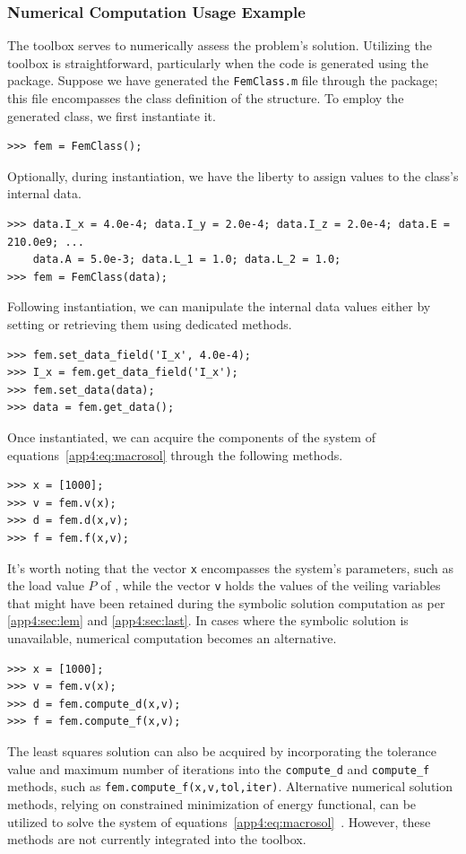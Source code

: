 \subsubsection{Numerical Computation Usage Example}

The \TrussMe{} \Matlab{} toolbox serves to numerically assess the problem's solution. Utilizing the toolbox is straightforward, particularly when the code is generated using the \TrussMe{} \Maple{} package. Suppose we have generated the \texttt{FemClass.m} file through the \TrussMe{} \Maple{} package; this file encompasses the class definition of the structure. To employ the generated class, we first instantiate it.
%
\begin{verbatim}
>>> fem = FemClass();
\end{verbatim}
%
Optionally, during instantiation, we have the liberty to assign values to the class's internal data.
%
\begin{verbatim}
>>> data.I_x = 4.0e-4; data.I_y = 2.0e-4; data.I_z = 2.0e-4; data.E = 210.0e9; ...
    data.A = 5.0e-3; data.L_1 = 1.0; data.L_2 = 1.0;
>>> fem = FemClass(data);
\end{verbatim}
%
Following instantiation, we can manipulate the internal data values either by setting or retrieving them using dedicated methods.
%
\begin{verbatim}
>>> fem.set_data_field('I_x', 4.0e-4);
>>> I_x = fem.get_data_field('I_x');
>>> fem.set_data(data);
>>> data = fem.get_data();
\end{verbatim}
%
Once instantiated, we can acquire the components of the system of equations~\eqref{app4:eq:macrosol} through the following methods.
%
\begin{verbatim}
>>> x = [1000];
>>> v = fem.v(x);
>>> d = fem.d(x,v);
>>> f = fem.f(x,v);
\end{verbatim}
%
It's worth noting that the vector \texttt{x} encompasses the system's parameters, such as the load value $P$ of , while the vector \texttt{v} holds the values of the veiling variables that might have been retained during the symbolic solution computation as per \ref{app4:sec:lem} and \ref{app4:sec:last}. In cases where the symbolic solution is unavailable, numerical computation becomes an alternative.
%
\begin{verbatim}
>>> x = [1000];
>>> v = fem.v(x);
>>> d = fem.compute_d(x,v);
>>> f = fem.compute_f(x,v);
\end{verbatim}
%
The least squares solution can also be acquired by incorporating the tolerance value and maximum number of iterations into the \texttt{compute\_d} and \texttt{compute\_f} methods, such as \texttt{fem.compute\_f(x,v,tol,iter)}. Alternative numerical solution methods, relying on constrained minimization of energy functional, can be utilized to solve the system of equations~\eqref{app4:eq:macrosol}~\cite{hutton2004fundamentals}. However, these methods are not currently integrated into the \TrussMe{} \Matlab{} toolbox.

